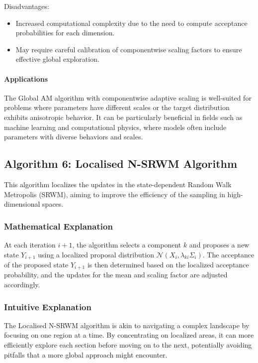 \documentclass{article}
\begin{document}
Disadvantages:
\begin{itemize}
    \item Increased computational complexity due to the need to compute acceptance probabilities for each dimension.
    \item May require careful calibration of componentwise scaling factors to ensure effective global exploration.
\end{itemize}

\paragraph{Applications}
The Global AM algorithm with componentwise adaptive scaling is well-suited for problems where parameters have different scales or the target distribution exhibits anisotropic behavior. It can be particularly beneficial in fields such as machine learning and computational physics, where models often include parameters with diverse behaviors and scales.

\subsection{Algorithm 6: Localised N-SRWM Algorithm}

This algorithm localizes the updates in the state-dependent Random Walk Metropolis (SRWM), aiming to improve the efficiency of the sampling in high-dimensional spaces.

\subsubsection{Mathematical Explanation}
At each iteration \(i+1\), the algorithm selects a component \(k\) and proposes a new state \(Y_{i+1}\) using a localized proposal distribution \(\mathcal{N}(X_i, \lambda_{ki} \Sigma_{i})\). The acceptance of the proposed state \(Y_{i+1}\) is then determined based on the localized acceptance probability, and the updates for the mean and scaling factor are adjusted accordingly.

\subsubsection{Intuitive Explanation}
The Localised N-SRWM algorithm is akin to navigating a complex landscape by focusing on one region at a time. By concentrating on localized areas, it can more efficiently explore each section before moving on to the next, potentially avoiding pitfalls that a more global approach might encounter.
\end{document}
